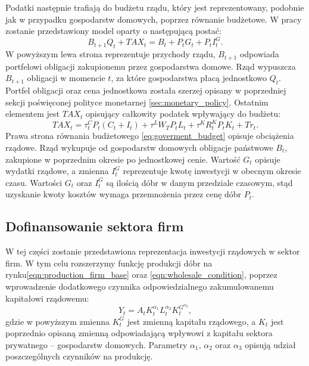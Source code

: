 Podatki następnie trafiają do budżetu rządu, który jest reprezentowany, podobnie jak w przypadku gospodarstw domowych, poprzez równanie budżetowe. W pracy zostanie przedstawiony model oparty o następującą postać:
\begin{equation}
    \label{eq:goverment_budget}
    B_{t+1}Q_t + TAX_t = B_{t} +  P_t G_t + P_t I^G_t.
\end{equation}
W powyższym lewa strona reprezentuje przychody rządu, $B_{t+1}$ odpowiada portfelowi obligacji zakupionemu przez gospodarstwa domowe. Rząd wypuszcza $B_{t+1}$ obligacji w momencie $t$, za które gospodarstwa płacą jednostkowo $Q_t$. Portfel obligacji oraz cena jednostkowa została szerzej opisany w poprzedniej sekcji poświęconej polityce monetarnej \ref{sec:monetary_policy}. Ostatnim elementem jest $TAX_t$ opisujący całkowity podatek wpływający do budżetu:
\begin{equation}
    TAX_t = \tau_t^C P_t (C_t + I_t) + \tau^L W_T P_t L_t + \tau^K R^K_t P_t K_t + Tr_t.
\end{equation}
Prawa strona równania budżetowego \eqref{eq:goverment_budget} opisuje obciążenia rządowe. Rząd wykupuje od gospodarstw domowych obligacje państwowe $B_{t}$, zakupione w poprzednim okresie po jednostkowej cenie. Wartość $G_t$ opisuje wydatki rządowe, a zmienna $I^G_t$ reprezentuje kwotę inwestycji w obecnym okresie czasu. Wartości $G_t$ oraz $I^G_t$ są ilością dóbr w danym przedziale czasowym, stąd uzyskanie kwoty kosztów wymaga przemnożenia przez cenę dóbr $P_t$.

\subsection{Dofinansowanie sektora firm}

W tej części zostanie przedstawiona reprezentacja inwestycji rządowych w sektor firm. W tym celu rozszerzymy funkcję produkcji dóbr na rynku\eqref{eqn:production_firm_base} oraz \eqref{eqn:wholesale_condition}, poprzez wprowadzenie dodatkowego czynnika odpowiedzialnego zakumulowanemu kapitałowi rządowemu:
\begin{equation}
    Y_t = A_t K_t^{{\alpha_1}}L_t^{\alpha_2}K_t^{G^{\alpha_3}},
\end{equation}
gdzie w powyższym zmienna $K_t^{G}$ jest zmienną kapitału rządowego, a $K_t$ jest poprzednio opisaną zmienną odpowiadającą wpływowi z kapitału sektora prywatnego -- gospodarstw domowych. Parametry $\alpha_1$, $\alpha_2$ oraz $\alpha_3$ opisują udział poszczególnych czynników na produkcję. 

